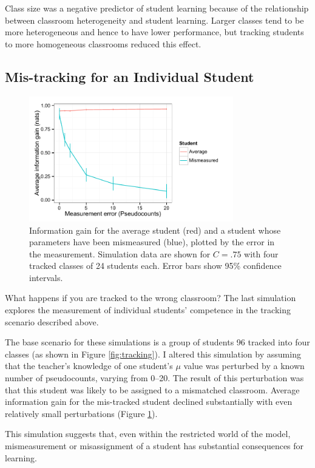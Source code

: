 \documentclass[10pt,letterpaper]{article}
\begin{document}
Class size was a negative predictor of student learning because of the relationship between classroom heterogeneity and student learning. Larger classes tend to be more heterogeneous and hence to have lower performance, but tracking students to more homogeneous classrooms reduced this effect.

\subsection{Mis-tracking for an Individual Student}

\begin{figure}[t]
\begin{center}
\includegraphics[width=3.5in]{figures/mismeasured.pdf}
\end{center}
\caption{\label{fig:mismeasure} Information gain for the average student (red) and a student whose parameters have been mismeasured (blue), plotted by the error in the measurement. Simulation data are shown for $C=.75$ with four tracked classes of 24 students each. Error bars show 95\% confidence intervals.}
\end{figure}

What happens if you are tracked to the wrong classroom? The last simulation explores the measurement of individual students' competence in the tracking scenario described above. 

The base scenario for these simulations is a group of students 96 tracked into four classes (as shown in Figure \ref{fig:tracking}). I altered this simulation by assuming that the teacher's knowledge of one student's $\mu$ value was perturbed by a known number of pseudocounts, varying from 0--20. The result of this perturbation was that this student was likely to be assigned to a mismatched classroom. Average information gain for the mis-tracked student declined substantially with even relatively small perturbations (Figure \ref{fig:mismeasure}). 

This simulation suggests that, even within the restricted world of the model, mismeasurement or misassignment of a student has substantial consequences for learning.
\end{document}
